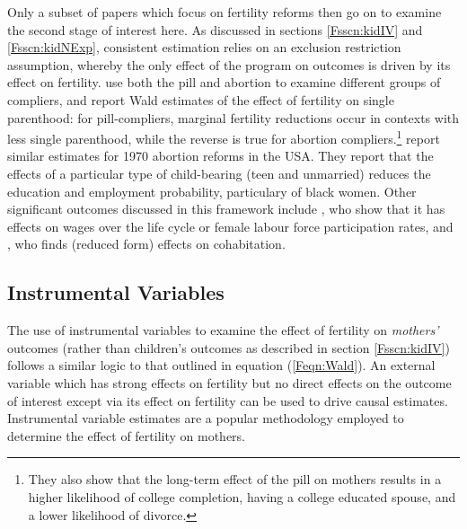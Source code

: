 Only a subset of papers which focus on fertility reforms then go on to examine
the second stage of interest here.  As discussed in sections \ref{Fsscn:kidIV} 
and \ref{Fsscn:kidNExp}, consistent estimation relies on an exclusion restriction
assumption, whereby the only effect of the program on outcomes is driven by
its effect on fertility. \citet{OltmansHungerman2012} use both the pill and
abortion to examine different groups of compliers, and report Wald estimates
of the effect of fertility on single parenthood: for pill-compliers, marginal
fertility reductions occur in contexts with less single parenthood, while the
reverse is true for abortion compliers.\footnote{They also show that the 
long-term effect of the pill on mothers results in a higher likelihood of college 
completion, having a college educated spouse, and a lower likelihood of 
divorce.} \citet{AngristEvans1996} report similar estimates for 1970 abortion 
reforms in the USA.  They report that the effects of a particular type of 
child-bearing (teen and unmarried) reduces the education and employment 
probability, particulary of black women.  Other significant outcomes discussed 
in this framework include \citet{Baileyetal2012,Bailey2006,Bailey2013}, who 
show that it has effects on wages over the life cycle or female labour force 
participation rates, and \citet{Christensen2012}, who finds (reduced form) 
effects on cohabitation.

\subsection{Instrumental Variables}
The use of instrumental variables to examine the effect of fertility on 
\emph{mothers'} outcomes (rather than children's outcomes as described
in section \ref{Fsscn:kidIV}) follows a similar logic to that outlined in
equation (\ref{Feqn:Wald}).  An external variable which has strong effects
on fertility but no direct effects on the outcome of interest except via its
effect on fertility can be used to drive causal estimates.  Instrumental 
variable estimates are a popular methodology employed to determine the 
effect of fertility on mothers.

